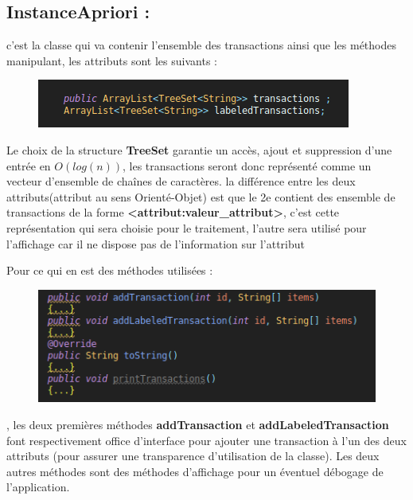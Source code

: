 			\subsection*{InstanceApriori : } c'est la classe qui va contenir l'ensemble des transactions ainsi que les méthodes manipulant, les attributs sont les suivants : \\
			\begin{figure}[H]
				\centering
				\includegraphics[width=0.75\linewidth]{apriori/images/data_structs/instance/properties.png}
			\end{figure}
			\par 
			Le choix de la structure \textbf{TreeSet} garantie un accès, ajout et suppression d'une entrée en $O(log(n))$, les transactions seront donc représenté comme un vecteur d'ensemble de chaînes de caractères. la différence entre les deux attributs(attribut au sens Orienté-Objet) est que le 2e contient des ensemble de transactions de la forme \textbf{<attribut:valeur\_attribut>}, c'est cette représentation qui sera choisie pour le traitement, l'autre sera utilisé pour l'affichage car il ne dispose pas de l'information sur l'attribut
			\par Pour ce qui en est des méthodes utilisées : 
			\begin{figure}[H]
				\centering
				\includegraphics[width=0.75\linewidth]{apriori/images/data_structs/instance/methods.png}
			\end{figure}
			\par, les deux premières méthodes \textbf{addTransaction} et \textbf{addLabeledTransaction} font respectivement office d'interface pour ajouter une transaction à l'un des deux attributs (pour assurer une transparence d'utilisation de la classe). Les deux autres méthodes sont des méthodes d'affichage pour un éventuel débogage de l'application.
			

